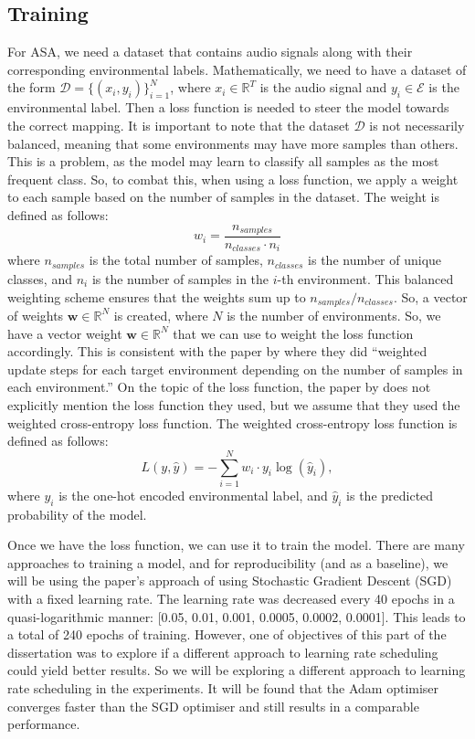 \documentclass[logo,bsc,singlespacing,parskip,online]{infthesis}
\begin{document}
\subsection{Training}
For ASA, we need a dataset that contains audio signals along with their corresponding environmental labels. 
Mathematically, we need to have a dataset of the form \(\mathcal{D} = \{(x_i, y_i)\}_{i=1}^{N}\), where \(x_i \in \mathbb{R}^{T}\) is the audio signal and \(y_i \in \mathcal{E}\) is the environmental label.
Then a loss function is needed to steer the model towards the correct mapping.
It is important to note that the dataset \(\mathcal{D}\) is not necessarily balanced,
meaning that some environments may have more samples than others.
This is a problem, as the model may learn to classify all samples as the most frequent class. 
So, to combat this, when using a loss function, we apply a weight to each sample based on the number of samples in the dataset.
The weight is defined as follows:
\[
w_i = \frac{n_{samples}}{n_{classes} \cdot n_i}
\]
where \(n_{samples}\) is the total number of samples, \(n_{classes}\) is the number of unique classes, and \(n_i\) is the number of samples in the \(i\)-th environment.
This balanced weighting scheme ensures that the weights sum up to \(n_{samples}/n_{classes}\).
So, a vector of weights \(\mathbf{w} \in \mathbb{R}^{N}\) is created, where \(N\) is the number of environments.
So, we have a vector weight \(\mathbf{w} \in \mathbb{R}^{N}\) that we can use to weight the loss function accordingly.
This is consistent with the paper by \citet{Huwel2020HearDS} where they did ``weighted update steps for each target environment depending on the number of samples in each environment.''
On the topic of the loss function, the paper by \citet{Huwel2020HearDS} does 
not explicitly mention the loss function they used, but we assume that they used the weighted cross-entropy loss function.
The weighted cross-entropy loss function is defined as follows:
\[
L(y, \hat{y}) = -\sum_{i=1}^{N} w_i \cdot y_i \log(\hat{y}_i),
\]
where \(y_i\) is the one-hot encoded environmental label, and \(\hat{y}_i\) is the predicted probability of the model.

Once we have the loss function, we can use it to train the model. There are many approaches to training a model,
and for reproducibility (and as a baseline), we will be using the paper's approach of using Stochastic Gradient Descent (SGD) with a fixed learning rate.
The learning rate was decreased every 40 epochs in a quasi-logarithmic manner: [0.05, 0.01, 0.001, 0.0005, 0.0002, 0.0001].
This leads to a total of 240 epochs of training. 
However, one of objectives of this part of the dissertation was to explore if a different approach to learning rate scheduling
could yield better results. So we will be exploring a different approach to learning rate scheduling in the experiments.
It will be found that the Adam optimiser converges faster than the SGD optimiser and still results in a comparable 
performance. 
\end{document}
